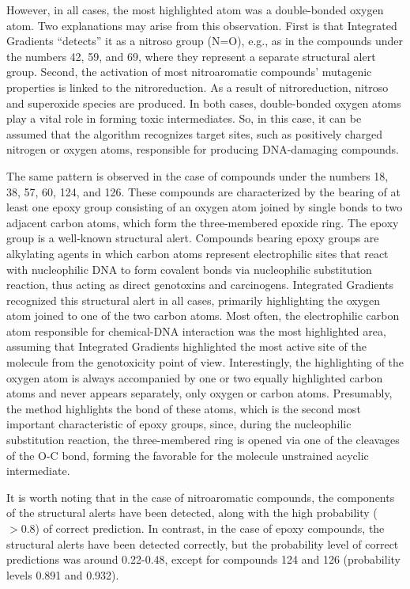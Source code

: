 However, in all cases, the most highlighted atom was a double-bonded oxygen atom. Two explanations may arise from this observation. First is that Integrated Gradients ``detects'' it as a nitroso group (N=O), e.g., as in the compounds under the numbers 42, 59, and 69, where they represent a separate structural alert group. Second, the activation of most nitroaromatic compounds' mutagenic properties is linked to the nitroreduction. As a result of nitroreduction, nitroso and superoxide species are produced.%
In both cases, double-bonded oxygen atoms play a vital role in forming toxic intermediates. So, in this case, it can be assumed that the algorithm recognizes target sites, such as positively charged nitrogen or oxygen atoms, responsible for producing DNA-damaging compounds.

The same pattern is observed in the case of compounds under the numbers 18, 38, 57, 60, 124, and 126. These compounds are characterized by the bearing of at least one epoxy group consisting of an oxygen atom joined by single bonds to two adjacent carbon atoms, which form the three-membered epoxide ring.%
The epoxy group is a well-known structural alert. Compounds bearing epoxy groups are alkylating agents in which carbon atoms represent electrophilic sites that react with nucleophilic DNA to form covalent bonds via nucleophilic substitution reaction, thus acting as direct genotoxins and carcinogens. Integrated Gradients recognized this structural alert in all cases, primarily highlighting the oxygen atom joined to one of the two carbon atoms. Most often, the electrophilic carbon atom responsible for chemical-DNA interaction was the most highlighted area, assuming that Integrated Gradients highlighted the most active site of the molecule from the genotoxicity point of view. Interestingly, the highlighting of the oxygen atom is always accompanied by one or two equally highlighted carbon atoms and never appears separately, only oxygen or carbon atoms. Presumably, the method highlights the bond of these atoms, which is the second most important characteristic of epoxy groups, since, during the nucleophilic substitution reaction, the three-membered ring is opened via one of the cleavages of the O-C bond, forming the favorable for the molecule unstrained acyclic intermediate. %

It is worth noting that in the case of nitroaromatic compounds, the components of the structural alerts have been detected, along with the high probability ($>0.8$) of correct prediction. In contrast, in the case of epoxy compounds, the structural alerts have been detected correctly, but the probability level of correct predictions was around 0.22-0.48, except for compounds 124 and 126 (probability levels 0.891 and 0.932).

